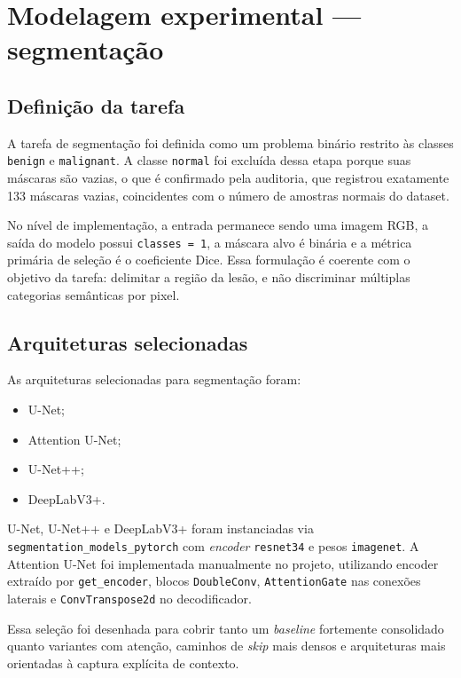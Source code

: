 \documentclass[tcc,capa]{texufpel}
\begin{document}
\section{Modelagem experimental --- segmentação}

\subsection{Definição da tarefa}

A tarefa de segmentação foi definida como um problema binário restrito às classes \texttt{benign} e \texttt{malignant}. A classe \texttt{normal} foi excluída dessa etapa porque suas máscaras são vazias, o que é confirmado pela auditoria, que registrou exatamente 133 máscaras vazias, coincidentes com o número de amostras normais do dataset.

No nível de implementação, a entrada permanece sendo uma imagem RGB, a saída do modelo possui \texttt{classes = 1}, a máscara alvo é binária e a métrica primária de seleção é o coeficiente Dice. Essa formulação é coerente com o objetivo da tarefa: delimitar a região da lesão, e não discriminar múltiplas categorias semânticas por pixel.

\subsection{Arquiteturas selecionadas}

As arquiteturas selecionadas para segmentação foram:
\begin{itemize}
	\item U-Net;
	\item Attention U-Net;
	\item U-Net++;
	\item DeepLabV3+.
\end{itemize}

U-Net, U-Net++ e DeepLabV3+ foram instanciadas via \texttt{segmentation\_models\_pytorch} com \textit{encoder} \texttt{resnet34} e pesos \texttt{imagenet}. A Attention U-Net foi implementada manualmente no projeto, utilizando encoder extraído por \texttt{get\_encoder}, blocos \texttt{DoubleConv}, \texttt{AttentionGate} nas conexões laterais e \texttt{ConvTranspose2d} no decodificador.

Essa seleção foi desenhada para cobrir tanto um \textit{baseline} fortemente consolidado quanto variantes com atenção, caminhos de \textit{skip} mais densos e arquiteturas mais orientadas à captura explícita de contexto.
\end{document}
